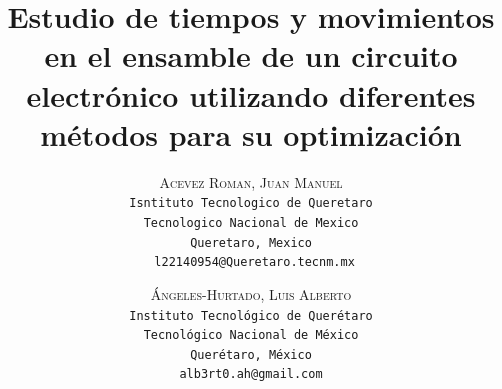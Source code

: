     \lfoot{ \thepage}
    
    \setlength{\droptitle}{-5\baselineskip} %
    \title{\textbf{Estudio de tiempos y movimientos en el ensamble de un circuito electrónico utilizando diferentes métodos para su optimización }} %
    
     \author{ 
     \textsc{Acevez Roman, Juan Manuel}\\ 
     \texttt{ Isntituto Tecnologico de Queretaro } \\ 
     \texttt{ Tecnologico Nacional de Mexico } \\ 
     \texttt{ Queretaro, Mexico }\\ 
     \texttt{ l22140954@Queretaro.tecnm.mx} 
     \and 
     \textsc{Ángeles-Hurtado, Luis Alberto}\\ 
     \texttt{ Instituto Tecnológico de Querétaro } \\ 
     \texttt{ Tecnológico Nacional de México } \\ 
     \texttt{Querétaro, México}\\ 
     \texttt{alb3rt0.ah@gmail.com} 
    }
    
    
    
    
